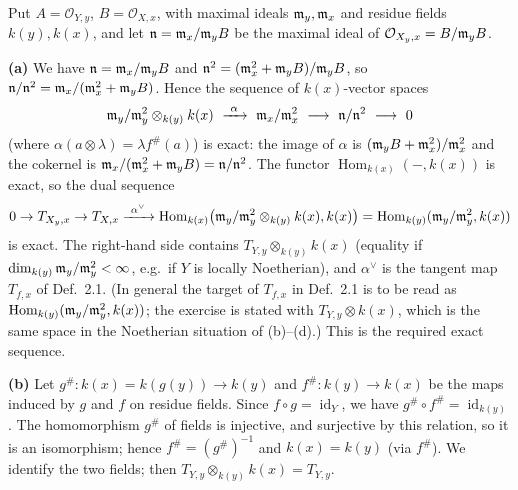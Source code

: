 \documentclass[11pt]{article}
\begin{document}
\pf
Put $A=\mathcal O_{Y,y}$, $B=\mathcal O_{X,x}$, with maximal ideals $\mathfrak m_y,\mathfrak m_x$ and residue fields $k(y),k(x)$, and let $\mathfrak n=\mathfrak m_x/\mathfrak m_yB$ be the maximal ideal of $\mathcal O_{X_y,x}=B/\mathfrak m_yB$.

\textbf{(a)} We have $\mathfrak n=\mathfrak m_x/\mathfrak m_yB$ and $\mathfrak n^2=(\mathfrak m_x^2+\mathfrak m_yB)/\mathfrak m_yB$, so $\mathfrak n/\mathfrak n^2=\mathfrak m_x/(\mathfrak m_x^2+\mathfrak m_yB)$. Hence the sequence of $k(x)$-vector spaces
\[ \fm_y/\fm_y^2\otimes_{k(y)}k(x)\ \xrightarrow{\ \alpha\ }\ \fm_x/\fm_x^2\ \longrightarrow\ \fn/\fn^2\ \longrightarrow\ 0 \]
(where $\alpha(a\otimes\lambda)=\lambda f^\#(a)$) is exact: the image of $\alpha$ is $(\mathfrak m_yB+\mathfrak m_x^2)/\mathfrak m_x^2$ and the cokernel is $\mathfrak m_x/(\mathfrak m_x^2+\mathfrak m_yB)=\mathfrak n/\mathfrak n^2$. The functor $\operatorname{Hom}_{k(x)}(-,k(x))$ is exact, so the dual sequence
\[ 0\to T_{X_y,x}\to T_{X,x}\xrightarrow{\ \alpha^\vee\ }\operatorname{Hom}_{k(x)}\bigl(\fm_y/\fm_y^2\otimes_{k(y)}k(x),k(x)\bigr)=\operatorname{Hom}_{k(y)}(\fm_y/\fm_y^2,k(x)) \]
is exact. The right-hand side contains $T_{Y,y}\otimes_{k(y)}k(x)$ (equality if $\dim_{k(y)}\mathfrak m_y/\mathfrak m_y^2<\infty$, e.g.\ if $Y$ is locally Noetherian), and $\alpha^\vee$ is the tangent map $T_{f,x}$ of Def.~2.1. (In general the target of $T_{f,x}$ in Def.~2.1 is to be read as $\operatorname{Hom}_{k(y)}(\mathfrak m_y/\mathfrak m_y^2,k(x))$; the exercise is stated with $T_{Y,y}\otimes k(x)$, which is the same space in the Noetherian situation of (b)--(d).) This is the required exact sequence.

\textbf{(b)} Let $g^\#:k(x)=k(g(y))\to k(y)$ and $f^\#:k(y)\to k(x)$ be the maps induced by $g$ and $f$ on residue fields. Since $f\circ g=\operatorname{id}_Y$, we have $g^\#\circ f^\#=\operatorname{id}_{k(y)}$. The homomorphism $g^\#$ of fields is injective, and surjective by this relation, so it is an isomorphism; hence $f^\#=(g^\#)^{-1}$ and $k(x)=k(y)$ (via $f^\#$). We identify the two fields; then $T_{Y,y}\otimes_{k(y)}k(x)=T_{Y,y}$.
\end{document}
